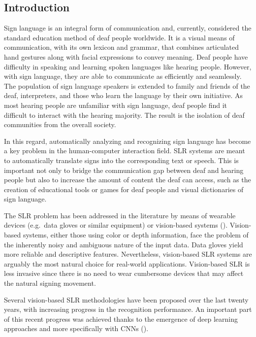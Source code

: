 \subsection{Introduction}
Sign language is an integral form of communication and, currently, considered the standard education method of deaf people worldwide. It is a visual means of communication, with its own lexicon and grammar, that combines articulated hand gestures along with facial expressions to convey meaning. Deaf people have difficulty in speaking and learning spoken languages like hearing people. However, with sign language, they are able to communicate as efficiently and seamlessly. The population of sign language speakers is extended to family and friends of the deaf, interpreters, and those who learn the language by their own initiative. As most hearing people are unfamiliar with sign language, deaf people find it difficult to interact with the hearing majority. The result is the isolation of deaf communities from the overall society.

In this regard, automatically analyzing and recognizing sign language has become a key problem in the human-computer interaction field. SLR systems are meant to automatically translate signs into the corresponding text or speech. This is important not only to bridge the communication gap between deaf and hearing people but also to increase the amount of content the deaf can access, such as the creation of educational tools or games for deaf people and visual dictionaries of sign language.

The SLR problem has been addressed in the literature by means of wearable devices (e.g.\ data gloves or similar equipment) or vision-based systems (\citet{Ahdal2012}). Vision-based systems, either those using color or depth information, face the problem of the inherently noisy and ambiguous nature of the input data. Data gloves yield more reliable and descriptive features. Nevertheless, vision-based SLR systems are arguably the most natural choice for real-world applications. Vision-based SLR is less invasive since there is no need to wear cumbersome devices that may affect the natural signing movement.

Several vision-based SLR methodologies have been proposed over the last twenty years, with increasing progress in the recognition performance. An important part of this recent progress was achieved thanks to the emergence of deep learning approaches and more specifically with CNNs (\citet{Pigou2015, Koller2016, Wu2016, Neverova2016, Kumar2017}).

